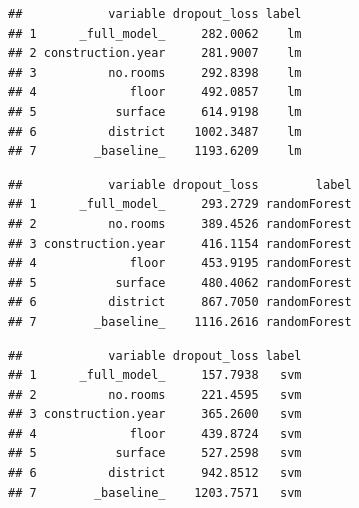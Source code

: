 \documentclass[]{krantz}
\newenvironment{Shaded}{\begin{snugshade}}{\end{snugshade}}
\newcommand{\DataTypeTok}[1]{\textcolor[rgb]{0.13,0.29,0.53}{#1}}
\newcommand{\DecValTok}[1]{\textcolor[rgb]{0.00,0.00,0.81}{#1}}
\newcommand{\KeywordTok}[1]{\textcolor[rgb]{0.13,0.29,0.53}{\textbf{#1}}}
\newcommand{\NormalTok}[1]{#1}
\newcommand{\OperatorTok}[1]{\textcolor[rgb]{0.81,0.36,0.00}{\textbf{#1}}}
\newcommand{\StringTok}[1]{\textcolor[rgb]{0.31,0.60,0.02}{#1}}
\theoremstyle{definition}
\theoremstyle{definition}
\theoremstyle{definition}
\theoremstyle{remark}
\begin{document}
\begin{verbatim}
##            variable dropout_loss label
## 1      _full_model_     282.0062    lm
## 2 construction.year     281.9007    lm
## 3          no.rooms     292.8398    lm
## 4             floor     492.0857    lm
## 5           surface     614.9198    lm
## 6          district    1002.3487    lm
## 7        _baseline_    1193.6209    lm
\end{verbatim}

\begin{Shaded}
\end{Shaded}

\begin{verbatim}
##            variable dropout_loss        label
## 1      _full_model_     293.2729 randomForest
## 2          no.rooms     389.4526 randomForest
## 3 construction.year     416.1154 randomForest
## 4             floor     453.9195 randomForest
## 5           surface     480.4062 randomForest
## 6          district     867.7050 randomForest
## 7        _baseline_    1116.2616 randomForest
\end{verbatim}

\begin{Shaded}
\end{Shaded}

\begin{verbatim}
##            variable dropout_loss label
## 1      _full_model_     157.7938   svm
## 2          no.rooms     221.4595   svm
## 3 construction.year     365.2600   svm
## 4             floor     439.8724   svm
## 5           surface     527.2598   svm
## 6          district     942.8512   svm
## 7        _baseline_    1203.7571   svm
\end{verbatim}
\end{document}
